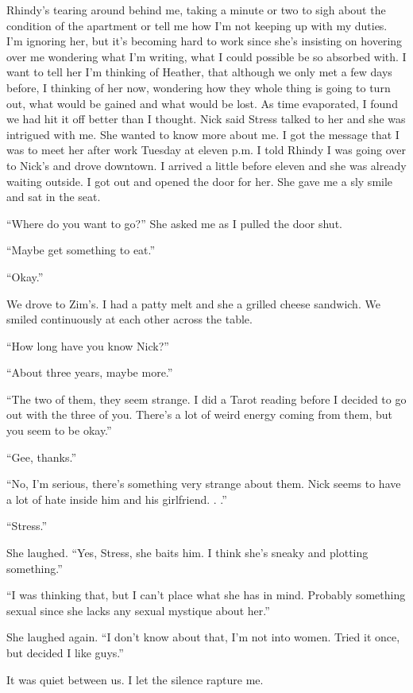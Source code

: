 Rhindy's tearing around behind me, taking a minute or two to sigh about
the condition of the apartment or tell me how I'm not keeping up with my
duties. I'm ignoring her, but it's becoming hard to work since she's
insisting on hovering over me wondering what I'm writing, what I could
possible be so absorbed with. I want to tell her I'm thinking of
Heather, that although we only met a few days before, I thinking of her
now, wondering how they whole thing is going to turn out, what would be
gained and what would be lost. As time evaporated, I found we had hit it
off better than I thought. Nick said Stress talked to her and she was
intrigued with me. She wanted to know more about me. I got the message
that I was to meet her after work Tuesday at eleven p.m. I told Rhindy I
was going over to Nick's and drove downtown. I arrived a little before
eleven and she was already waiting outside. I got out and opened the
door for her. She gave me a sly smile and sat in the seat.

``Where do you want to go?'' She asked me as I pulled the door shut.

``Maybe get something to eat.''

``Okay.''

We drove to Zim's. I had a patty melt and she a grilled cheese sandwich.
We smiled continuously at each other across the table.

``How long have you know Nick?''

``About three years, maybe more.''

``The two of them, they seem strange. I did a Tarot reading before I
decided to go out with the three of you. There's a lot of weird energy
coming from them, but you seem to be okay.''

``Gee, thanks.''

``No, I'm serious, there's something very strange about them. Nick seems
to have a lot of hate inside him and his girlfriend. . .''

``Stress.''

She laughed. ``Yes, Stress, she baits him. I think she's sneaky and
plotting something.''

``I was thinking that, but I can't place what she has in mind. Probably
something sexual since she lacks any sexual mystique about her.''

She laughed again. ``I don't know about that, I'm not into women. Tried
it once, but decided I like guys.''

It was quiet between us. I let the silence rapture me.

